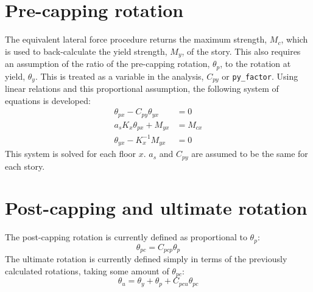 \documentclass[11pt,letterpaper]{article}
\begin{document}
\section{Pre-capping rotation}
The equivalent lateral force procedure returns the maximum strength, $M_c$, which is used to back-calculate the yield strength, $M_y$, of the story. This also requires an assumption of the ratio of the pre-capping rotation, $θ_p$, to the rotation at yield, $θ_y$. This is treated as a variable in the analysis, $C_{py}$ or \texttt{py\_factor}. Using linear relations and this proportional assumption, the following system of equations is developed:
\begin{subequations}
  \label{eq:rotation}
  \begin{align}
    θ_{px} - C_{py}θ_{yx} & = 0 \label{eq:rotate1} \\
    a_sK_xθ_{px} + M_{yx} & = M_{cx} \label{eq:rotate2} \\
    θ_{yx} - K_x^{-1}M_{yx} & = 0 \label{eq:rotate3}
  \end{align}
\end{subequations}
This system is solved for each floor $x$. $a_s$ and $C_{py}$ are assumed to be the same for each story.

\section{Post-capping and ultimate rotation}
The post-capping rotation is currently defined as proportional to $θ_p$:
\begin{equation}
  θ_{pc} = C_{pcp}θ_p
\end{equation}
The ultimate rotation is currently defined simply in terms of the previously calculated rotations, taking some amount of $θ_{pc}$:
\begin{equation}
  θ_u = θ_y + θ_p + C_{pcu}θ_{pc}
\end{equation}
\end{document}
